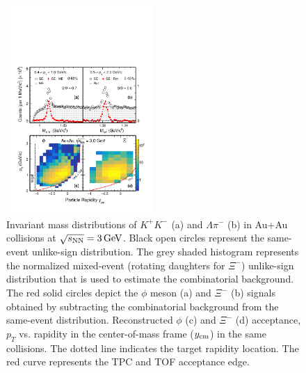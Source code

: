 \documentclass[aps,tightenlines,superscriptaddress,twocolumn]{revtex4-1}
\begin{document}
\begin{figure}
\centering
\hspace*{-4mm}
\includegraphics[width=0.50\textwidth]{fig1_signal-eps-converted-to.pdf}
  \caption{Invariant mass distributions of $K^+K^-$ (a) and  $\Lambda\pi^-$ (b) in Au+Au collisions at ${\sqrt{s_{\rm NN}} = \rm{3\,GeV}}$. Black open circles represent the same-event unlike-sign distribution. The grey shaded histogram represents the normalized mixed-event (rotating daughters for $\Xi^-$) unlike-sign distribution that is used to estimate the combinatorial background. The red solid circles depict the $\phi$ meson (a) and $\Xi^-$ (b) signals obtained by subtracting the combinatorial background from the same-event distribution. Reconstructed $\phi$ (c) and $\Xi^-$ (d) acceptance, $p_T$ vs. rapidity in the center-of-mass frame ($y_{\rm cm}$) in the same collisions. The dotted line indicates the target rapidity location. The red curve represents the TPC and TOF acceptance edge.}
\label{fig:phiSignal} 
\end{figure}
\end{document}
